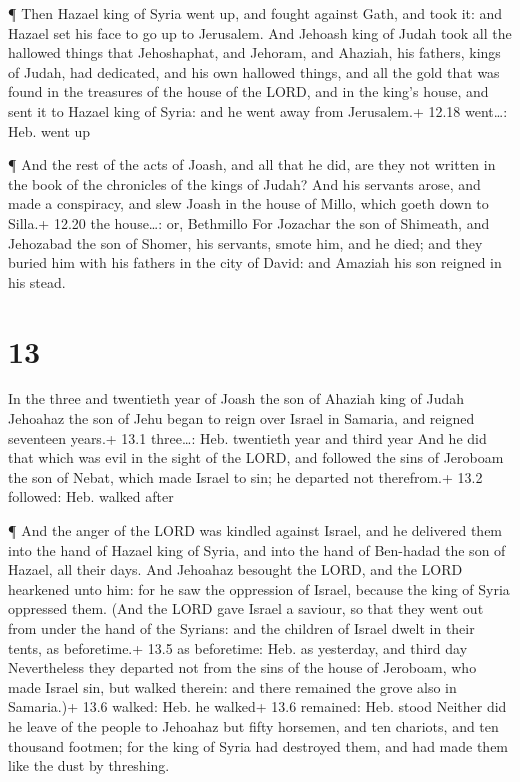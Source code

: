 ¶ Then Hazael king of Syria went up, and fought against
Gath, and took it: and Hazael set his face to go up to Jerusalem.
 And Jehoash king of Judah took all the hallowed things
that Jehoshaphat, and Jehoram, and Ahaziah, his fathers, kings of Judah,
had dedicated, and his own hallowed things, and all the gold that was
found in the treasures of the house of the LORD, and in the king's
house, and sent it to Hazael king of Syria: and he went away from
Jerusalem.+ 12.18 went\ldots: Heb. went up

 ¶ And the rest of the acts of Joash, and all that he did,
are they not written in the book of the chronicles of the kings of
Judah?  And his servants arose, and made a conspiracy, and
slew Joash in the house of Millo, which goeth down to Silla.+ 12.20 the
house\ldots: or, Bethmillo  For Jozachar the son of
Shimeath, and Jehozabad the son of Shomer, his servants, smote him, and
he died; and they buried him with his fathers in the city of David: and
Amaziah his son reigned in his stead.

\hypertarget{section-12}{%
\section{13}\label{section-12}}

 In the three and twentieth year of Joash the son of Ahaziah
king of Judah Jehoahaz the son of Jehu began to reign over Israel in
Samaria, and reigned seventeen years.+ 13.1 three\ldots: Heb. twentieth
year and third year  And he did that which was evil in the
sight of the LORD, and followed the sins of Jeroboam the son of Nebat,
which made Israel to sin; he departed not therefrom.+ 13.2 followed:
Heb. walked after

 ¶ And the anger of the LORD was kindled against Israel, and
he delivered them into the hand of Hazael king of Syria, and into the
hand of Ben-hadad the son of Hazael, all their days.  And
Jehoahaz besought the LORD, and the LORD hearkened unto him: for he saw
the oppression of Israel, because the king of Syria oppressed them.
 (And the LORD gave Israel a saviour, so that they went out
from under the hand of the Syrians: and the children of Israel dwelt in
their tents, as beforetime.+ 13.5 as beforetime: Heb. as yesterday, and
third day  Nevertheless they departed not from the sins of
the house of Jeroboam, who made Israel sin, but walked therein: and
there remained the grove also in Samaria.)+ 13.6 walked: Heb. he walked+
13.6 remained: Heb. stood  Neither did he leave of the
people to Jehoahaz but fifty horsemen, and ten chariots, and ten
thousand footmen; for the king of Syria had destroyed them, and had made
them like the dust by threshing.

